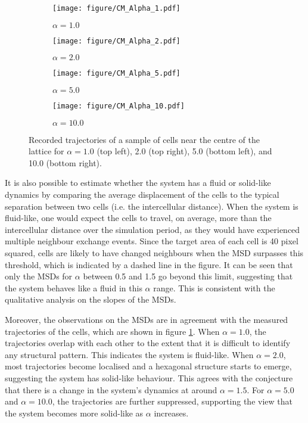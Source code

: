 \documentclass[a4paper,12pt]{article}
\begin{document}
\begin{figure}[h]
\centering
\begin{subfigure}[h]{0.496\textwidth}
\texttt{[image: figure/CM\_Alpha\_1.pdf]}
\caption*{$\alpha = 1.0$}
\end{subfigure}
\begin{subfigure}[h]{0.496\textwidth}
\texttt{[image: figure/CM\_Alpha\_2.pdf]}
\caption*{$\alpha = 2.0$}
\end{subfigure}
\begin{subfigure}[h]{0.496\textwidth}
\texttt{[image: figure/CM\_Alpha\_5.pdf]}
\caption*{$\alpha = 5.0$}
\end{subfigure}
\begin{subfigure}[h]{0.496\textwidth}
\texttt{[image: figure/CM\_Alpha\_10.pdf]}
\caption*{$\alpha = 10.0$}
\end{subfigure}
\caption{Recorded trajectories of a sample of cells near the centre of the lattice for $\alpha = 1.0$ (top left), 2.0 (top right), 5.0 (bottom left), and 10.0 (bottom right). }
\label{fig:cmalpha}
\end{figure}
\FloatBarrier

It is also possible to estimate whether the system has a fluid or solid-like dynamics by comparing the average displacement of the cells to the typical separation between two cells (i.e. the intercellular distance). When the system is fluid-like, one would expect the cells to travel, on average, more than the intercellular distance over the simulation period, as they would have experienced multiple neighbour exchange events. Since the target area of each cell is 40 pixel squared, cells are likely to have changed neighbours when the MSD surpasses this threshold, which is indicated by a dashed line in the figure. It can be seen that only the MSDs for $\alpha$ between 0.5 and 1.5 go beyond this limit, suggesting that the system behaves like a fluid in this $\alpha$ range. This is consistent with the qualitative analysis on the slopes of the MSDs.  


Moreover, the observations on the MSDs are in agreement with the measured trajectories of the cells, which are shown in figure \ref{fig:cmalpha}. When $\alpha = 1.0$, the trajectories overlap with each other to the extent that it is difficult to identify any structural pattern. This indicates the system is fluid-like. When $\alpha = 2.0$, most trajectories become localised and a hexagonal structure starts to emerge, suggesting the system has solid-like behaviour. This agrees with the conjecture that there is a change in the system's dynamics at around $\alpha = 1.5$. For $\alpha = 5.0$ and $\alpha = 10.0$, the trajectories are further suppressed, supporting the view that the system becomes more solid-like as $\alpha$ increases. 
\end{document}
